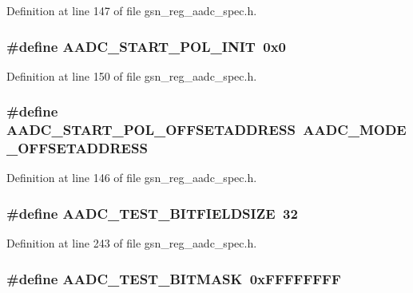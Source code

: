 Definition at line 147 of file gsn\_\-reg\_\-aadc\_\-spec.h.

\hypertarget{a00543_a983a6704e332a23c1ee0ebdf03048a37}{
\subsubsection[{AADC\_\-START\_\-POL\_\-INIT}]{\setlength{\rightskip}{0pt plus 5cm}\#define AADC\_\-START\_\-POL\_\-INIT~0x0}}
\label{a00543_a983a6704e332a23c1ee0ebdf03048a37}


Definition at line 150 of file gsn\_\-reg\_\-aadc\_\-spec.h.

\hypertarget{a00543_a58cec959afd0a2b2f21a0bee6194dc4b}{
\subsubsection[{AADC\_\-START\_\-POL\_\-OFFSETADDRESS}]{\setlength{\rightskip}{0pt plus 5cm}\#define AADC\_\-START\_\-POL\_\-OFFSETADDRESS~AADC\_\-MODE\_\-OFFSETADDRESS}}
\label{a00543_a58cec959afd0a2b2f21a0bee6194dc4b}


Definition at line 146 of file gsn\_\-reg\_\-aadc\_\-spec.h.

\hypertarget{a00543_ac3ee7603ceb942ae71c171fd4c00af2a}{
\subsubsection[{AADC\_\-TEST\_\-BITFIELDSIZE}]{\setlength{\rightskip}{0pt plus 5cm}\#define AADC\_\-TEST\_\-BITFIELDSIZE~32}}
\label{a00543_ac3ee7603ceb942ae71c171fd4c00af2a}


Definition at line 243 of file gsn\_\-reg\_\-aadc\_\-spec.h.

\hypertarget{a00543_a3797d4c731638648c17a51cbc61609b3}{
\subsubsection[{AADC\_\-TEST\_\-BITMASK}]{\setlength{\rightskip}{0pt plus 5cm}\#define AADC\_\-TEST\_\-BITMASK~0xFFFFFFFF}}
\label{a00543_a3797d4c731638648c17a51cbc61609b3}


